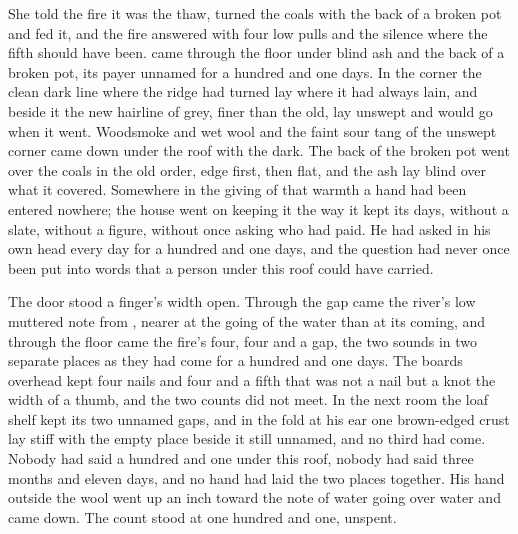 She told the fire it was the thaw, turned the coals with the back of a broken pot and fed it, and the fire answered with four low pulls and the silence where the fifth should have been.  came through the floor under blind ash and the back of a broken pot, its payer unnamed for a hundred and one days. In the corner the clean dark line where the  ridge had turned lay where it had always lain, and beside it the new hairline of grey, finer than the old, lay unswept and would go when it went. Woodsmoke and wet wool and the faint sour tang of the unswept corner came down under the roof with the dark. The back of the broken pot went over the coals in the old order, edge first, then flat, and the ash lay blind over what it covered. Somewhere in the giving of that warmth a hand had been entered nowhere; the house went on keeping it the way it kept its days, without a slate, without a figure, without once asking who had paid. He had asked in his own head every day for a hundred and one days, and the question had never once been put into words that a person under this roof could have carried.

The door stood a finger's width open. Through the gap came the river's low muttered note from , nearer at the going of the water than at its coming, and through the floor came the fire's four, four and a gap, the two sounds in two separate places as they had come for a hundred and one days. The boards overhead kept four nails and four and a fifth that was not a nail but a knot the width of a thumb, and the two counts did not meet. In the next room the loaf shelf kept its two unnamed gaps, and in the fold at his ear one brown-edged crust lay stiff with the empty place beside it still unnamed, and no third had come. Nobody had said a hundred and one under this roof, nobody had said three months and eleven days, and no hand had laid the two places together. His hand outside the wool went up an inch toward the note of water going over water and came down. The count stood at one hundred and one, unspent.
